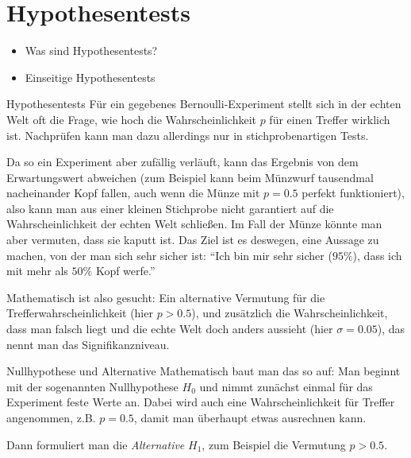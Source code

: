 \chapter{Hypothesentests}
\begin{inhalt}
  \begin{itemize}
    \item Was sind Hypothesentests?
    \item Einseitige Hypothesentests
  \end{itemize}
\end{inhalt}

\begin{bla}
  {Hypothesentests}
  Für ein gegebenes Bernoulli-Experiment stellt sich in der echten Welt oft die Frage, wie hoch die Wahrscheinlichkeit $p$ für einen Treffer wirklich ist.
  Nachprüfen kann man dazu allerdings nur in stichprobenartigen Tests.

  Da so ein Experiment aber zufällig verläuft, kann das Ergebnis von dem Erwartungswert abweichen (zum Beispiel kann beim Münzwurf tausendmal nacheinander Kopf fallen, auch wenn die Münze mit $p=0.5$ perfekt funktioniert), also kann man aus einer kleinen Stichprobe nicht garantiert auf die Wahrscheinlichkeit der echten Welt schließen.
  Im Fall der Münze könnte man aber vermuten, dass sie kaputt ist.
  Das Ziel ist es deswegen, eine Aussage zu machen, von der man sich sehr sicher ist: ``Ich bin mir sehr sicher ($95\%$), dass ich mit mehr als \( 50\% \) Kopf werfe.''

  Mathematisch ist also gesucht:
  Ein alternative Vermutung für die Trefferwahrscheinlichkeit (hier $p>0.5$), und zusätzlich die Wahrscheinlichkeit, dass man falsch liegt und die echte Welt doch anders aussieht (hier $\sigma = 0.05$), das nennt man das Signifikanzniveau.
\end{bla}

\begin{bla}{Nullhypothese und Alternative}
  Mathematisch baut man das so auf:
  Man beginnt mit der sogenannten Nullhypothese $H_0$ und nimmt zunächst einmal für das Experiment feste Werte an.
  Dabei wird auch eine Wahrscheinlichkeit für Treffer angenommen, z.B. $p=0.5$, damit man überhaupt etwas ausrechnen kann.

  Dann formuliert man die \emph{Alternative} $H_1$, zum Beispiel die Vermutung $p>0.5$.
\end{bla}


